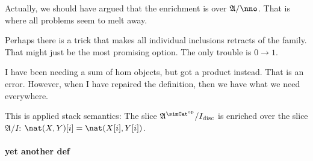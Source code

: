 \documentclass{tac}
\newcommand\dual{^{\mathrm{op}}}
\newcommand\s{^{\simCat\dual}}
\newcommand\ambient{\mathfrak A}
\newcommand\disc{_{\rm disc}}
\begin{document}
Actually, we should have argued that the enrichment is over $\ambient/\nno$.
That is where all problems seem to melt away.

Perhaps there is a trick that makes all individual inclusions retracts of the family. 
That might just be the most promising option.
The only trouble is $0\to 1$.


I have been needing a sum of hom objects, but got a product instead.
That is an error. However, when I have repaired the definition, then we have what we need everywhere.

This is applied stack semantics:
The slice $\ambient\s/I\disc$ is enriched over the slice $\ambient/I$: $\nat(X,Y)[i] = \nat(X[i],Y[i])$.

\paragraph{yet another def}
\end{document}
